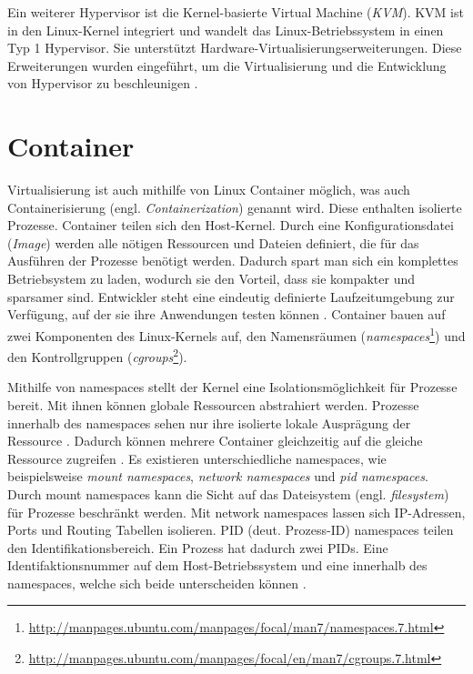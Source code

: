 Ein weiterer Hypervisor ist die Kernel-basierte Virtual Machine (\emph{KVM}).
KVM ist in den Linux-Kernel integriert und wandelt
das Linux-Betriebssystem in einen Typ 1 Hypervisor. Sie unterstützt
Hardware-Virtualisierungserweiterungen. Diese Erweiterungen wurden eingeführt,
um die Virtualisierung und die Entwicklung von Hypervisor
zu beschleunigen \cite{IBMHypervisor} \cite{RedHatKVM}.

\section{Container}
Virtualisierung ist auch mithilfe von Linux Container möglich,
was auch Containerisierung (engl. \emph{Containerization})
genannt wird. Diese enthalten isolierte Prozesse.
Container teilen sich den Host-Kernel. Durch eine
Konfigurationsdatei (\emph{Image}) werden alle
nötigen Ressourcen und Dateien definiert, die für das Ausführen
der Prozesse benötigt werden. Dadurch spart man sich ein komplettes
Betriebsystem zu laden, wodurch sie den Vorteil,
dass sie kompakter und sparsamer sind. Entwickler steht eine eindeutig
definierte Laufzeitumgebung zur Verfügung, auf der sie ihre Anwendungen testen
können \cite{RedHatContainer}. Container bauen auf zwei Komponenten
des Linux-Kernels auf, den Namensräumen
(\emph{namespaces}\footnote{\url{http://manpages.ubuntu.com/manpages/focal/man7/namespaces.7.html}})
und den Kontrollgruppen
(\emph{cgroups}\footnote{\url{http://manpages.ubuntu.com/manpages/focal/en/man7/cgroups.7.html}}).

Mithilfe von namespaces stellt der Kernel eine Isolationsmöglichkeit
für Prozesse bereit. Mit ihnen können globale Ressourcen abstrahiert werden.
Prozesse innerhalb des namespaces sehen nur ihre isolierte lokale
Ausprägung der Ressource \cite{UbuntuNamespaces}.
Dadurch können mehrere Container gleichzeitig auf die gleiche
Ressource zugreifen \cite{RedHatIntroToLinuxContainers}.
Es existieren unterschiedliche namespaces, wie beispielsweise
\emph{mount namespaces}, \emph{network namespaces}
und \emph{pid namespaces}.
Durch mount namespaces kann die Sicht auf das Dateisystem
(engl. \emph{filesystem}) für Prozesse beschränkt werden.
Mit network namespaces lassen sich IP-Adressen, Ports
und Routing Tabellen isolieren. PID (deut. Prozess-ID) namespaces teilen
den Identifikationsbereich. Ein Prozess hat dadurch zwei
PIDs. Eine Identifaktionsnummer auf dem Host-Betriebssystem und eine
innerhalb des namespaces, welche sich beide unterscheiden können
\cite{LwnDotNetNamespaces}.

